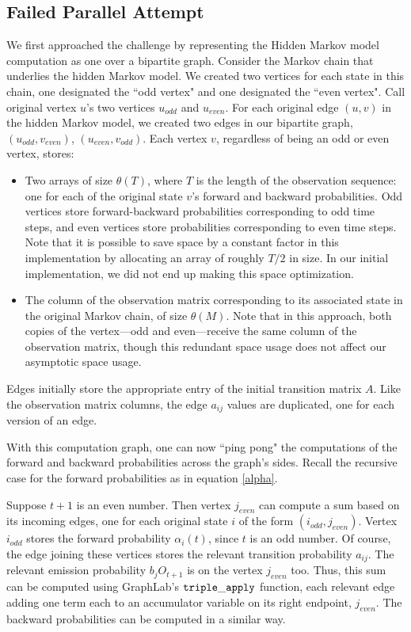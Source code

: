 \subsection{Failed Parallel Attempt}
We first approached the challenge by representing the Hidden Markov model computation as one over a bipartite graph.  Consider the Markov chain that underlies the hidden Markov model.  We created two vertices for each state in this chain, one designated the ``odd vertex" and one designated the ``even vertex".  Call original vertex $u$'s two vertices $u_{odd}$ and $u_{even}$. For each original edge $(u, v)$ in the hidden Markov model, we created two edges in our bipartite graph, $(u_{odd}, v_{even})$, $(u_{even}, v_{odd})$.   Each vertex $v$, regardless of being an odd or even vertex, stores: 

\begin{itemize}
	\item Two arrays of size $\theta(T)$, where $T$ is the length of the observation sequence: one for each of the original state $v$'s forward and backward probabilities.  Odd vertices store forward-backward probabilities corresponding to odd time steps, and even vertices store probabilities corresponding to even time steps.  Note that it is possible to save space by a constant factor in this implementation by allocating an array of roughly $T/2$ in size.  In our initial implementation, we did not end up making this space optimization.  
	
	\item The column of the observation matrix corresponding to its associated state in the original Markov chain, of size $\theta(M)$.  Note that in this approach, both copies of the vertex---odd and even---receive the same column of the observation matrix, though this redundant space usage does not affect our asymptotic space usage.
\end{itemize}

Edges initially store the appropriate entry of the initial transition matrix $A$.  Like the observation matrix columns, the edge $a_{ij}$ values are duplicated, one for each version of an edge.

With this computation graph, one can now ``ping pong" the computations of the forward and backward probabilities across the graph's sides.  Recall the recursive case for the forward probabilities as in equation \ref{alpha}.

Suppose $t+1$ is an even number.  Then vertex $j_{even}$ can compute a sum based on its incoming edges, one for each original state $i$ of the form $(i_{odd}, j_{even})$.  Vertex $i_{odd}$ stores the forward probability $\alpha_{i}(t)$, since $t$ is an odd number.  Of course, the edge joining these vertices stores the relevant transition probability $a_{ij}$.  The relevant emission probability $b_jO_{t + 1}$ is on the vertex $j_{even}$ too.  Thus, this sum can be computed using GraphLab's $\tt{triple\_apply}$ function, each relevant edge adding one term each to an accumulator variable on its right endpoint, $j_{even}$.  The backward probabilities can be computed in a similar way.

